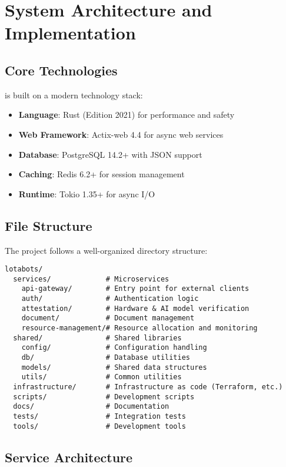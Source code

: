 \section{System Architecture and Implementation}

\subsection{Core Technologies}

\sysname{} is built on a modern technology stack:

\begin{itemize}
    \item \textbf{Language}: Rust (Edition 2021) for performance and safety
    \item \textbf{Web Framework}: Actix-web 4.4 for async web services
    \item \textbf{Database}: PostgreSQL 14.2+ with JSON support
    \item \textbf{Caching}: Redis 6.2+ for session management
    \item \textbf{Runtime}: Tokio 1.35+ for async I/O
\end{itemize}

\subsection{File Structure}

The project follows a well-organized directory structure:

\begin{verbatim}
lotabots/
  services/             # Microservices
    api-gateway/        # Entry point for external clients
    auth/               # Authentication logic
    attestation/        # Hardware & AI model verification
    document/           # Document management
    resource-management/# Resource allocation and monitoring
  shared/               # Shared libraries
    config/             # Configuration handling
    db/                 # Database utilities
    models/             # Shared data structures
    utils/              # Common utilities
  infrastructure/       # Infrastructure as code (Terraform, etc.)
  scripts/              # Development scripts
  docs/                 # Documentation
  tests/                # Integration tests
  tools/                # Development tools
\end{verbatim}

\subsection{Service Architecture}

